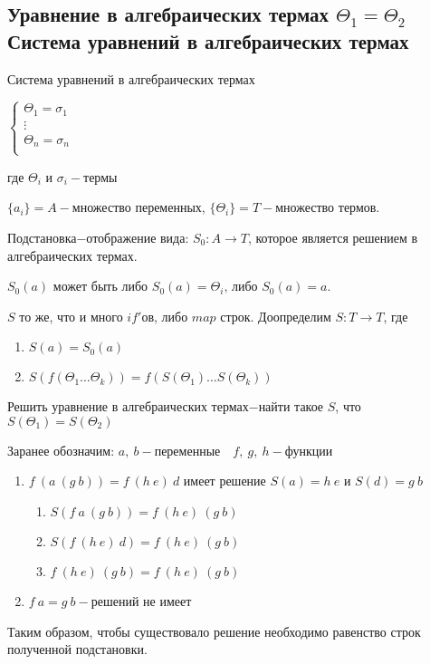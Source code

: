 	\subsection{Уравнение в алгебраических термах $\Theta_1=\Theta_2$\\Система уравнений в алгебраических термах}
	\begin{definition}Система уравнений в алгебраических термах\end{definition}
	$
		\begin{cases}
			\Theta_1=\sigma_1&\\
			\vdots&\\
			\Theta_n=\sigma_n&\\
		\end{cases}
	$\par где $\Theta_i \text{ и } \sigma_i-\text{термы}$\par
	\begin{definition}$\{a_i\}=A-$множество переменных, $\{\Theta_i\}=T-$множество термов.\end{definition}
	\begin{definition}Подстановка$-$отображение вида: $S_0:A\to T$, которое является решением в алгебраических термах.\par $S_0(a)$ может быть либо $S_0(a)=\Theta_i\text{, либо }S_0(a)=a$.\end{definition} 
	$S$ то же, что и много $if'$ов, либо $map$ строк. Доопределим $S:T\to T$, где \begin{enumerate}
		\item $S(a)=S_0(a)$
		\item $S(f(\Theta_1 \ldots \Theta_k))=f(S(\Theta_1) \ldots S(\Theta_k))$
	\end{enumerate}
	
	\begin{definition}Решить уравнение в алгебраических термах$-$найти такое $S$, что $S(\Theta_1)=S(\Theta_2)$\end{definition} 

	\begin{example}\end{example}
		Заранее обозначим: $a,\:b-\text{переменные}\hspace{1em} f,\:g,\:h-\text{функции}$
		\begin{enumerate}
			\item $f\:(a\:(g\:b))=f\:(h\:e)\:d$ имеет решение $S(a)=h\:e\text{ и }S(d)=g\:b$
				\begin{enumerate}
					\item $S(f\:a\:(g\:b))=f\:(h\:e)\:(g\:b)$
					\item $S(f\:(h\:e)\:d)=f\:(h\:e)\:(g\:b)$
					\item $f\:(h\:e)\:(g\:b)=f\:(h\:e)\:(g\:b)$
				\end{enumerate}
			\item $f\:a=g\:b-$решений не имеет
		\end{enumerate}
		Таким образом, чтобы существовало решение необходимо равенство строк полученной подстановки.\par

